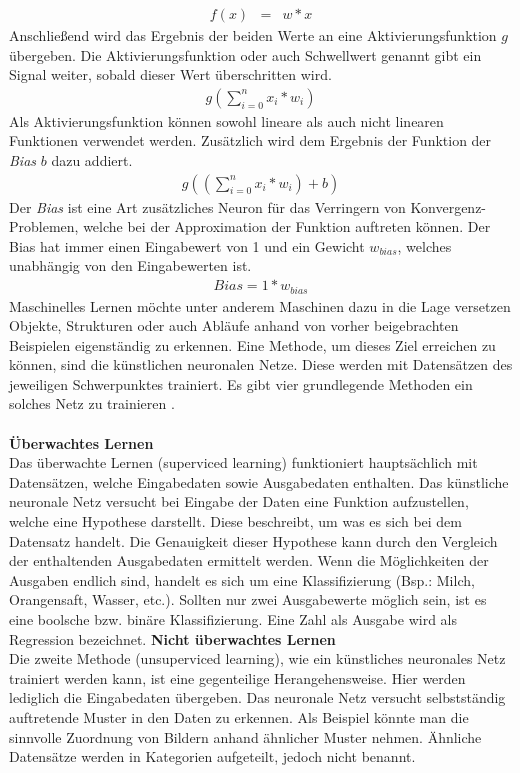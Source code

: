 \begin{eqnarray} f(x) & = & w*x \end{eqnarray}
Anschließend wird das Ergebnis der beiden Werte an eine Aktivierungsfunktion $g$ übergeben. Die Aktivierungsfunktion oder auch Schwellwert genannt gibt ein Signal weiter, sobald dieser Wert überschritten wird.
\begin{eqnarray} g( \sum_{i=0}^n x_{i} *w_{i}) \end{eqnarray}
Als Aktivierungsfunktion können sowohl lineare als auch nicht linearen Funktionen verwendet werden. Zusätzlich wird dem Ergebnis der Funktion der \textit{Bias} $b$ dazu addiert.
\begin{eqnarray} g(( \sum_{i=0}^n x_{i} *w_{i}) +b) \end{eqnarray}
Der \textit{Bias} ist eine Art zusätzliches Neuron für das Verringern von Konvergenz-Problemen, welche bei der Approximation der Funktion auftreten können. Der Bias hat immer einen Eingabewert von 1 und ein Gewicht $w_{bias}$, welches unabhängig von den Eingabewerten ist.
\begin{eqnarray} Bias = 1*w_{bias} \end{eqnarray}
Maschinelles Lernen möchte unter anderem Maschinen dazu in die Lage versetzen Objekte, Strukturen oder auch Abläufe anhand von vorher beigebrachten Beispielen eigenständig zu erkennen. Eine Methode, um dieses Ziel erreichen zu können, sind die künstlichen neuronalen Netze. Diese werden mit Datensätzen des jeweiligen Schwerpunktes trainiert. Es gibt vier grundlegende Methoden ein solches Netz zu trainieren \cite[694ff.]{russell2016artificial}.\\\\
\textbf{Überwachtes Lernen}\\
Das überwachte Lernen (superviced learning) funktioniert hauptsächlich mit Datensätzen, welche Eingabedaten sowie Ausgabedaten enthalten. Das künstliche neuronale Netz versucht bei Eingabe der Daten eine Funktion aufzustellen, welche eine Hypothese darstellt. Diese beschreibt, um was es sich bei dem Datensatz handelt. Die Genauigkeit dieser Hypothese kann durch den Vergleich der enthaltenden Ausgabedaten ermittelt werden. Wenn die Möglichkeiten der Ausgaben endlich sind, handelt es sich um eine Klassifizierung (Bsp.: Milch, Orangensaft, Wasser, etc.). Sollten nur zwei Ausgabewerte möglich sein, ist es eine boolsche bzw. binäre Klassifizierung. Eine Zahl als Ausgabe wird als Regression bezeichnet.
\newpage
\textbf{Nicht überwachtes Lernen}\\
Die zweite Methode (unsuperviced learning), wie ein künstliches neuronales Netz trainiert werden kann, ist eine gegenteilige Herangehensweise. Hier werden lediglich die Eingabedaten übergeben. Das neuronale Netz versucht selbstständig auftretende Muster in den Daten zu erkennen. Als Beispiel könnte man die sinnvolle Zuordnung von Bildern anhand ähnlicher Muster nehmen. Ähnliche Datensätze werden in Kategorien aufgeteilt, jedoch nicht benannt.\\\\
